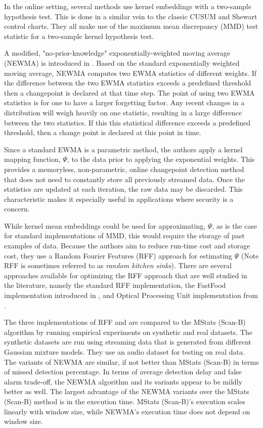 In the online setting, several methods use kernel embeddings with a two-sample hypothesis test. This is done in a similar vein to the classic CUSUM and Shewart control charts. They all make use of the maximum mean discrepancy (MMD) test statistic for a two-sample kernel hypothesis test. 


A modified, "no-prior-knowledge" exponentially-weighted moving average (NEWMA) is introduced in \cite{keriven2018newma}. Based on the standard exponentially weighted moving average, NEWMA computes two EWMA statistics of different weights. If the difference between the two EWMA statistics exceeds a predefined threshold then a changepoint is declared at that time step. The point of using two EWMA statistics is for one to have a larger forgetting factor. Any recent changes in a distribution will weigh heavily on one statistic, resulting in a large difference between the two statistics. If this this statistical difference exceeds a predefined threshold, then a change point is declared at this point in time.

Since a standard EWMA is a parametric method, the authors apply a kernel mapping function, $\Psi$, to the data prior to applying the exponential weights. This provides a memoryless, non-parametric, online changepoint detection method that does not need to constantly store all previously streamed data. Once the statistics are updated at each iteration, the raw data may be discarded. This characteristic makes it especially useful in applications where security is a concern.

While kernel mean embeddings could be used for approximating, $\Psi$, as is the case for standard implementations of MMD, this would require the storage of past examples of data. Because the authors aim to reduce run-time cost and storage cost, they use a Random Fourier Features (RFF) approach for estimating $\Psi$ (Note RFF is sometimes referred to as \textit{random kitchen sinks}). There are several approaches available for optimizing the RFF approach that are well studied in the literature, namely the standard RFF implementation, the FastFood implementation introduced in \cite{le2014fastfood}, and Optical Processing Unit implementation from \cite{saade2016random}. 

The three implementations of RFF and are compared to the MStats (Scan-B) algorithm by running empirical experiments on synthetic and real datasets. The synthetic datasets are run using streaming data that is generated from different Gaussian mixture models. They use an audio dataset for testing on real data. The variants of NEWMA are similar, if not better than MStats (Scan-B) in terms of missed detection percentage. In terms of average detection delay and false alarm trade-off, the NEWMA algorithm and its variants appear to be mildly better as well. The largest advantage of the NEWMA variants over the MStats (Scan-B) method is in the execution time. MStats (Scan-B)'s execution scales linearly with window size, while NEWMA's execution time does not depend on window size.

